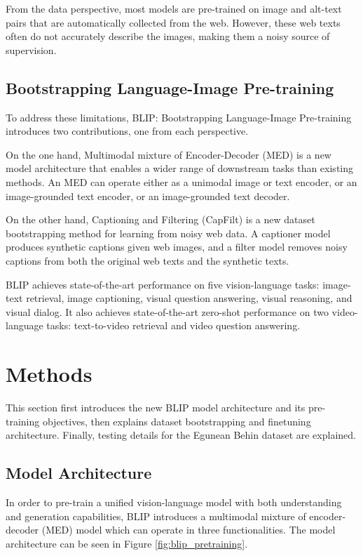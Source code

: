 \documentclass[11pt]{article}
\begin{document}
From the data perspective, most models are pre-trained on image and alt-text pairs that are automatically collected from the web. However, these web texts often do not accurately describe the images, making them a noisy source of supervision.

\subsection{Bootstrapping Language-Image Pre-training}

To address these limitations, BLIP: Bootstrapping Language-Image Pre-training \cite{li2022blip} introduces two contributions, one from each perspective.

On the one hand, Multimodal mixture of Encoder-Decoder (MED) is a new model architecture that enables a wider range of downstream tasks than existing methods. An MED can operate either as a unimodal image or text encoder, or an image-grounded text encoder, or an image-grounded text decoder.

On the other hand, Captioning and Filtering (CapFilt) is a new dataset bootstrapping method for learning from noisy web data. A captioner model produces synthetic captions given web images, and a filter model removes noisy captions from both the original web texts and the synthetic texts.

BLIP achieves state-of-the-art performance on five vision-language tasks:  image-text retrieval, image captioning, visual question answering, visual reasoning, and visual dialog. It also achieves state-of-the-art zero-shot performance on two video-language tasks: text-to-video retrieval and video question answering.

\section{Methods}

This section first introduces the new BLIP model architecture and its pre-training objectives, then explains dataset bootstrapping and finetuning architecture. Finally, testing details for the Egunean Behin dataset are explained.

\subsection{Model Architecture}

In order to pre-train a unified vision-language model with both understanding and generation capabilities, BLIP introduces a multimodal mixture of encoder-decoder (MED) model which can operate in three functionalities. The model architecture can be seen in Figure \ref{fig:blip_pretraining}.
\end{document}
